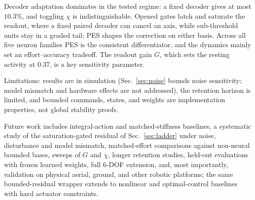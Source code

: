 \documentclass[letterpaper, 10 pt, conference]{ieeeconf}
\newcommand{\clip}{\operatorname{clip}}
\begin{document}
Decoder adaptation dominates in the tested regime: a fixed decoder gives at most $10.3\%$, and toggling $\chi$ is indistinguishable. Opened gates latch and saturate the readout, where a fixed paired decoder can cancel an axis, while sub-threshold units stay in a graded tail; PES shapes the correction on either basis. Across all five neuron families PES is the consistent differentiator, and the dynamics mainly set an effort--accuracy tradeoff. The readout gain $G$, which sets the resting activity at $0.37$, is a key sensitivity parameter.

Limitations: results are in simulation (Sec.~\ref{sec:noise} bounds noise sensitivity; model mismatch and hardware effects are not addressed), the retention horizon is limited, and bounded commands, states, and weights are implementation properties, not global stability proofs.

Future work includes integral-action and matched-stiffness baselines, a systematic study of the saturation-gated residual of Sec.~\ref{sec:ladder} under noise, disturbance and model mismatch, matched-effort comparisons against non-neural bounded bases, sweeps of $G$ and $\chi$, longer retention studies, held-out evaluations with frozen learned weights, full 6-DOF extension, and, most importantly, validation on physical aerial, ground, and other robotic platforms; the same bounded-residual wrapper extends to nonlinear and optimal-control baselines with hard actuator constraints.


\end{document}
